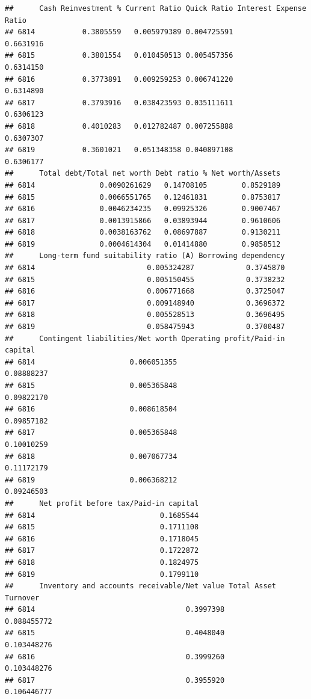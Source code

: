 \documentclass[
]{book}
\begin{document}
\begin{verbatim}
##      Cash Reinvestment % Current Ratio Quick Ratio Interest Expense Ratio
## 6814           0.3805559   0.005979389 0.004725591              0.6631916
## 6815           0.3801554   0.010450513 0.005457356              0.6314150
## 6816           0.3773891   0.009259253 0.006741220              0.6314890
## 6817           0.3793916   0.038423593 0.035111611              0.6306123
## 6818           0.4010283   0.012782487 0.007255888              0.6307307
## 6819           0.3601021   0.051348358 0.040897108              0.6306177
##      Total debt/Total net worth Debt ratio % Net worth/Assets
## 6814               0.0090261629   0.14708105        0.8529189
## 6815               0.0066551765   0.12461831        0.8753817
## 6816               0.0046234235   0.09925326        0.9007467
## 6817               0.0013915866   0.03893944        0.9610606
## 6818               0.0038163762   0.08697887        0.9130211
## 6819               0.0004614304   0.01414880        0.9858512
##      Long-term fund suitability ratio (A) Borrowing dependency
## 6814                          0.005324287            0.3745870
## 6815                          0.005150455            0.3738232
## 6816                          0.006771668            0.3725047
## 6817                          0.009148940            0.3696372
## 6818                          0.005528513            0.3696495
## 6819                          0.058475943            0.3700487
##      Contingent liabilities/Net worth Operating profit/Paid-in capital
## 6814                      0.006051355                       0.08888237
## 6815                      0.005365848                       0.09822170
## 6816                      0.008618504                       0.09857182
## 6817                      0.005365848                       0.10010259
## 6818                      0.007067734                       0.11172179
## 6819                      0.006368212                       0.09246503
##      Net profit before tax/Paid-in capital
## 6814                             0.1685544
## 6815                             0.1711108
## 6816                             0.1718045
## 6817                             0.1722872
## 6818                             0.1824975
## 6819                             0.1799110
##      Inventory and accounts receivable/Net value Total Asset Turnover
## 6814                                   0.3997398          0.088455772
## 6815                                   0.4048040          0.103448276
## 6816                                   0.3999260          0.103448276
## 6817                                   0.3955920          0.106446777

\end{verbatim}
\end{document}
